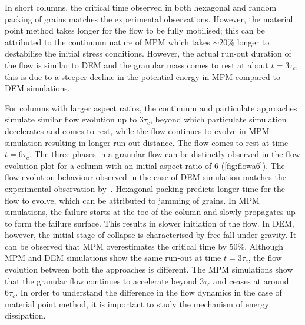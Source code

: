 In short columns, the critical time observed in both hexagonal and random 
packing of grains matches the experimental observations. However, the material 
point method takes longer for the flow to be fully mobilised; this can be 
attributed to the continuum nature of MPM which takes $\sim20\%$ longer to 
destabilise the initial stress conditions. However, the actual run-out duration 
of the flow is similar to DEM and the granular mass comes to rest at about 
$\textit{t}=3\tau_{c}$, this is due to a steeper decline in the potential 
energy in MPM compared to DEM simulations.
 
For columns with larger aspect ratios, the continuum and particulate approaches 
simulate similar flow evolution up to 3$\tau_{c}$, beyond 
which particulate simulation decelerates and comes to rest, while the flow 
continues to evolve in MPM simulation resulting in longer run-out distance. 
The flow comes to rest at time $\textit{t}=6\tau_{c}$. The 
three phases in a granular flow can be distinctly observed in the flow 
evolution plot for a column with an initial aspect ratio of 6 
(\cref{fig:flowa6}). The flow evolution 
behaviour observed in the case of DEM simulation matches the experimental 
observation by~\citet{Lajeunesse2004}. Hexagonal packing predicts longer time 
for the flow to evolve, which can be attributed to jamming of grains. 
In MPM simulations, the failure starts at the toe of the column and slowly 
propagates up to form the failure surface. This results in slower initiation of 
the flow. In DEM, however, the initial stage of collapse is characterised by 
free-fall under gravity. It can be observed that MPM overestimates the critical 
time by 50\%. Although MPM and DEM simulations show the same run-out at time 
$\textit{t}=3\tau_{c}$, the flow evolution between both the approaches is 
different. The MPM simulations show that the granular flow continues to 
accelerate beyond $3\tau_c$ and ceases at around $6\tau_{c}$. In order to 
understand the difference in the flow dynamics in the case of material point 
method, it is important to study the mechanism of energy dissipation. 


